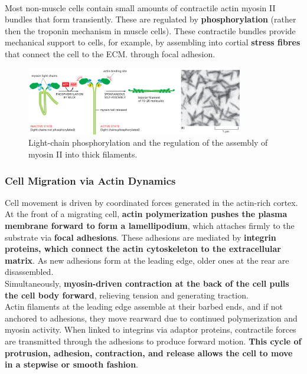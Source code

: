 \documentclass[../main.tex]{subfiles}
\begin{document}
\\
Most non-muscle cells contain small amounts of contractile actin myosin II bundles that form transiently. These are regulated by \textbf{phosphorylation} (rather then the troponin mechanism in muscle cells). These contractile bundles provide mechanical support to cells, for example, by assembling into cortial \textbf{stress fibres} that connect the cell to the ECM. through focal adhesion.   
\begin{figure}[H]
	\centering
	\includegraphics[width = 0.85\textwidth]{19}
	\caption{Light-chain phosphorylation and the regulation of the assembly of myosin II into thick filaments.}
\end{figure}


\subsubsection{Cell Migration via Actin Dynamics}
Cell movement is driven by coordinated forces generated in the actin-rich cortex. At the front of a migrating cell, \textbf{actin polymerization pushes the plasma membrane forward to form a lamellipodium}, which attaches firmly to the substrate via \textbf{focal adhesions}. These adhesions are mediated by \textbf{integrin proteins, which connect the actin cytoskeleton to the extracellular matrix}. As new adhesions form at the leading edge, older ones at the rear are disassembled. \\
\indent Simultaneously, \textbf{myosin-driven contraction at the back of the cell pulls the cell body forward}, relieving tension and generating traction. \\
\indent Actin filaments at the leading edge assemble at their barbed ends, and if not anchored to adhesions, they move rearward due to continued polymerization and myosin activity. When linked to integrins via adaptor proteins, contractile forces are transmitted through the adhesions to produce forward motion. \textbf{This cycle of protrusion, adhesion, contraction, and release allows the cell to move in a stepwise or smooth fashion}.
\end{document}
